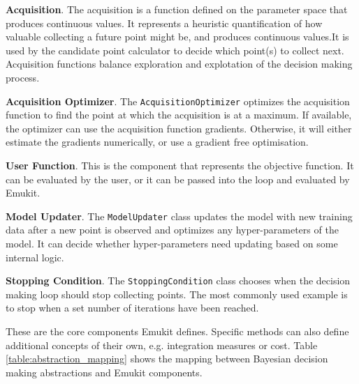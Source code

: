 \textbf{Acquisition}. The acquisition is a function defined on the parameter space that produces continuous values. It represents a heuristic quantification of how valuable collecting a future point might be, and produces continuous values.It is used by the candidate point calculator to decide which point(s) to collect next. Acquisition functions balance exploration and explotation of the decision making process.

\textbf{Acquisition Optimizer}. The \texttt{AcquisitionOptimizer} optimizes the acquisition function to find the point at which the acquisition is at a maximum. If available, the optimizer can use the acquisition function gradients. Otherwise, it will either estimate the gradients numerically, or use a gradient free optimisation.

\textbf{User Function}. This is the component that represents the objective function. It can be evaluated by the user, or it can be passed into the loop and evaluated by Emukit.

\textbf{Model Updater}. The \texttt{ModelUpdater} class updates the model with new training data after a new point is observed and optimizes any hyper-parameters of the model. It can decide whether hyper-parameters need updating based on some internal logic.

\textbf{Stopping Condition}. The \texttt{StoppingCondition} class chooses when the decision making loop should stop collecting points. The most commonly used example is to stop when a set number of iterations have been reached.

These are the core components Emukit defines. Specific methods can also define additional concepts of their own, e.g. integration measures or cost. Table \ref{table:abstraction_mapping} shows the mapping between Bayesian decision making abstractions and Emukit components.

